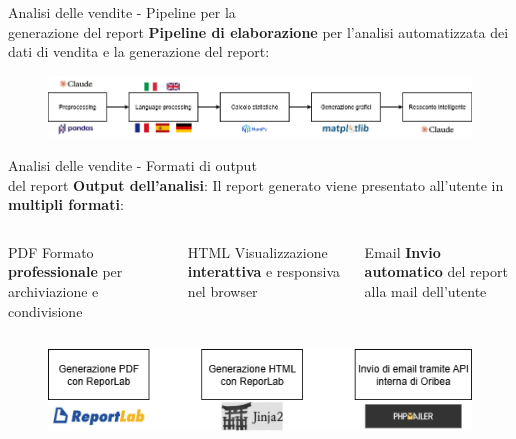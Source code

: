 \documentclass{beamer}
\begin{document}
	\begin{frame}{Analisi delle vendite - Pipeline per la\\ generazione del report}
		\textbf{Pipeline di elaborazione} per l'analisi automatizzata dei dati di vendita e la generazione del report:

		\begin{figure}
			\centering
			\includegraphics[width=\textwidth]{Diagramma pipeline analisi delle vendite.png}
		\end{figure}
	\end{frame}

	\begin{frame}{Analisi delle vendite - Formati di output\\ del report}
		\textbf{Output dell'analisi}: Il report generato viene presentato all'utente in \textbf{multipli formati}:

		\begin{columns}
			\begin{column}{0.33\textwidth}
				\begin{block}{PDF}
					Formato \textbf{professionale} per archiviazione e condivisione
				\end{block}
			\end{column}
			\begin{column}{0.33\textwidth}
				\begin{block}{HTML}
					Visualizzazione \textbf{interattiva} e responsiva nel browser
				\end{block}
			\end{column}
			\begin{column}{0.33\textwidth}
				\begin{block}{Email}
					\textbf{Invio automatico} del report alla mail dell'utente
				\end{block}
			\end{column}
		\end{columns}

		\begin{figure}
			\centering
			\includegraphics[width=\textwidth]{Diagramma formati output del report.png}
		\end{figure}
	\end{frame}
\end{document}
